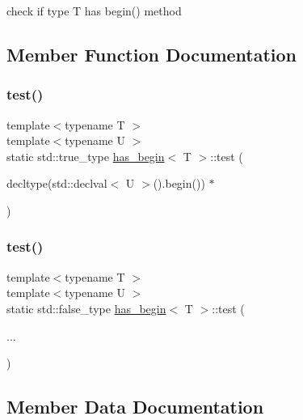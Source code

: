 check if type T has \textquotesingle{}begin()\textquotesingle{} method 

\subsection{Member Function Documentation}
\mbox{\label{structhas__begin_a9483204ce6d4d3de89ccd58f14e73cac}} 
\subsubsection{\texorpdfstring{test()}{test()}\hspace{0.1cm}{\footnotesize\ttfamily [1/2]}}
{\footnotesize\ttfamily template$<$typename T $>$ \\
template$<$typename U $>$ \\
static std\+::true\+\_\+type \hyperlink{structhas__begin}{has\+\_\+begin}$<$ T $>$\+::test (\begin{DoxyParamCaption}\item[{decltype(std\+::declval$<$ U $>$().begin()) $\ast$}]{ }\end{DoxyParamCaption})\hspace{0.3cm}{\ttfamily [static]}}

\mbox{\label{structhas__begin_a47c984fb137d9cbe3db134c6a5a22550}} 
\subsubsection{\texorpdfstring{test()}{test()}\hspace{0.1cm}{\footnotesize\ttfamily [2/2]}}
{\footnotesize\ttfamily template$<$typename T $>$ \\
template$<$typename U $>$ \\
static std\+::false\+\_\+type \hyperlink{structhas__begin}{has\+\_\+begin}$<$ T $>$\+::test (\begin{DoxyParamCaption}\item[{}]{... }\end{DoxyParamCaption})\hspace{0.3cm}{\ttfamily [static]}}



\subsection{Member Data Documentation}
\mbox{\label{structhas__begin_ae9ecdd6dfb43b08a7a028c5e8794359a}} 
